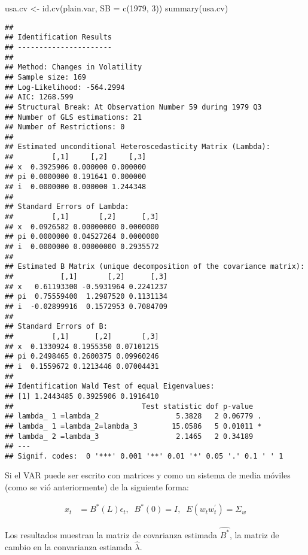 \documentclass[
]{book}
\newenvironment{Shaded}{\begin{snugshade}}{\end{snugshade}}
\newcommand{\AttributeTok}[1]{\textcolor[rgb]{0.77,0.63,0.00}{#1}}
\newcommand{\DecValTok}[1]{\textcolor[rgb]{0.00,0.00,0.81}{#1}}
\newcommand{\FunctionTok}[1]{\textcolor[rgb]{0.00,0.00,0.00}{#1}}
\newcommand{\NormalTok}[1]{#1}
\newcommand{\OtherTok}[1]{\textcolor[rgb]{0.56,0.35,0.01}{#1}}
\begin{document}
\begin{Shaded}
\begin{Highlighting}[]
\NormalTok{usa.cv }\OtherTok{\textless{}{-}} \FunctionTok{id.cv}\NormalTok{(plain.var, }\AttributeTok{SB =} \FunctionTok{c}\NormalTok{(}\DecValTok{1979}\NormalTok{, }\DecValTok{3}\NormalTok{))}
\FunctionTok{summary}\NormalTok{(usa.cv)}
\end{Highlighting}
\end{Shaded}

\begin{verbatim}
## 
## Identification Results
## ---------------------- 
## 
## Method: Changes in Volatility
## Sample size: 169
## Log-Likelihood: -564.2994
## AIC: 1268.599
## Structural Break: At Observation Number 59 during 1979 Q3
## Number of GLS estimations: 21
## Number of Restrictions: 0
## 
## Estimated unconditional Heteroscedasticity Matrix (Lambda):
##         [,1]     [,2]     [,3]
## x  0.3925906 0.000000 0.000000
## pi 0.0000000 0.191641 0.000000
## i  0.0000000 0.000000 1.244348
## 
## Standard Errors of Lambda:
##         [,1]       [,2]      [,3]
## x  0.0926582 0.00000000 0.0000000
## pi 0.0000000 0.04527264 0.0000000
## i  0.0000000 0.00000000 0.2935572
## 
## Estimated B Matrix (unique decomposition of the covariance matrix): 
##           [,1]       [,2]      [,3]
## x   0.61193300 -0.5931964 0.2241237
## pi  0.75559400  1.2987520 0.1131134
## i  -0.02899916  0.1572953 0.7084709
## 
## Standard Errors of B:
##         [,1]      [,2]       [,3]
## x  0.1330924 0.1955350 0.07101215
## pi 0.2498465 0.2600375 0.09960246
## i  0.1559672 0.1213446 0.07004431
## 
## Identification Wald Test of equal Eigenvalues:
## [1] 1.2443485 0.3925906 0.1916410
##                              Test statistic dof p-value  
## lambda_ 1 =lambda_2                  5.3828   2 0.06779 .
## lambda_ 1 =lambda_2=lambda_3        15.0586   5 0.01011 *
## lambda_ 2 =lambda_3                  2.1465   2 0.34189  
## ---
## Signif. codes:  0 '***' 0.001 '**' 0.01 '*' 0.05 '.' 0.1 ' ' 1
\end{verbatim}

Si el VAR puede ser escrito con matrices y como un sistema de media móviles (como se vió anteriormente) de la siguiente forma:

\begin{align}
x_{t}&=B^{*}(L)\epsilon_{t},\;\;B^{*}(0)=I,\;\;E(w_{t}w_{t}^{'})=\Sigma_w 
\end{align}

Los resultados muestran la matriz de covarianza estimada \(\hat{B^{*}}\), la matriz de cambio en la convarianza estiamda \(\hat{\lambda}\).
\end{document}
